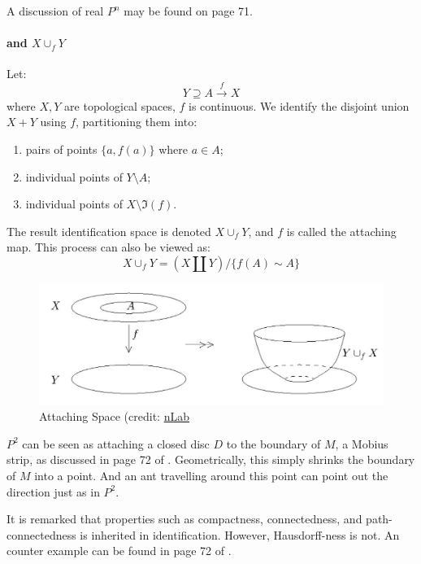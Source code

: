 \begin{defi}
    A discussion of real $P^n$ may be found on page 71.
\end{defi}

\paragraph{ and $X\cup_f Y$} Let:
\begin{equation}
    Y \supseteq A \overset{f}{\to} X
\end{equation}
where $X,Y$ are topological spaces, $f$ is continuous. We identify the
disjoint union $X+Y$ using $f$, partitioning them into:
\begin{enumerate}
    \item pairs of points $\{a,f(a)\}$ where $a\in A$;
    \item individual points of $Y\setminus A$;
    \item individual points of $X\setminus \Im(f)$.
\end{enumerate}
The result identification space is denoted $X\cup_f Y$, and $f$ is
called the attaching map. This process can also be viewed as:
\begin{equation}
    X\cup_f Y = (X\amalg Y)/\{f(A)\sim A\}
\end{equation}
\begin{figure}[H]
    \centering
    \includegraphics[width=0.6\linewidth]{pics/Attaching-Space.jpg}
    \caption{Attaching Space (credit:
        \href{https://ncatlab.org/nlab/show/Top}{nLab}}
\end{figure}
\begin{ex}
    $P^2$ can be seen as attaching a closed disc $D$ to the boundary
    of $M$, a Mobius strip, as discussed in page 72 of \cite{book}.
    Geometrically, this simply shrinks the boundary of $M$ into a
    point. And an ant travelling around this point can point out the
    direction just as in $P^2$.
\end{ex}
\begin{remark}
    It is remarked that properties such as compactness, connectedness,
    and path-connectedness is inherited in identification. However,
    Hausdorff-ness is not. An counter example can be found in page 72 of
    \cite{book}.
\end{remark}

